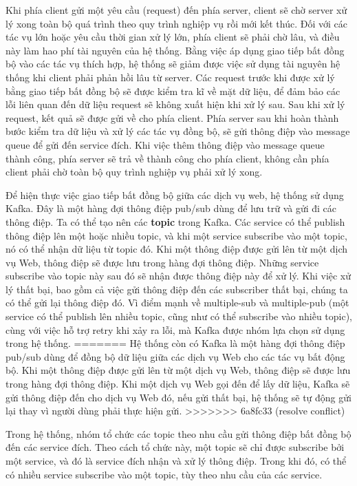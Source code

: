 \par Khi phía client gửi một yêu cầu (request) đến phía server, client sẽ chờ server xử lý xong toàn bộ quá trình theo quy trình nghiệp vụ rồi mới kết thúc. 
Đối với các tác vụ lớn hoặc yêu cầu thời gian xử lý lớn, phía client sẽ phải chờ lâu, và điều này làm hao phí tài nguyên của hệ thống. Bằng việc áp dụng giao tiếp bất đồng bộ vào các tác vụ thích hợp, hệ thống sẽ giảm được việc sử dụng tài nguyên hệ thống khi client phải phản hồi lâu từ server. 
Các request trước khi được xử lý bằng giao tiếp bất đồng bộ sẽ được kiểm tra kĩ về mặt dữ liệu, để đảm bảo các lỗi liên quan đến dữ liệu request sẽ không xuất hiện khi xử lý sau. Sau khi xử lý request, kết quả sẽ được gửi về cho phía client. 
Phía server sau khi hoàn thành bước kiểm tra dữ liệu và xử lý các tác vụ đồng bộ, sẽ gửi thông điệp vào message queue để gửi đến service đích. Khi việc thêm thông điệp vào message queue thành công, phía server sẽ trả về thành công cho phía client, không cần phía client phải chờ toàn bộ quy trình nghiệp vụ phải xử lý xong.

\par Để hiện thực việc giao tiếp bất đồng bộ giữa các dịch vụ web, hệ thống sử dụng Kafka. Đây là một hàng đợi thông điệp pub/sub dùng để lưu trữ và gửi đi các thông điệp.
Ta có thể tạo nên các \textbf{topic} trong Kafka. Các service có thể publish thông điệp lên một hoặc nhiều topic, 
và khi một service subscribe vào một topic, nó có thể nhận dữ liệu từ topic đó. 
Khi một thông điệp được gửi lên từ một dịch vụ Web, thông điệp sẽ được lưu trong hàng đợi thông điệp. 
Những service subscribe vào topic này sau đó sẽ nhận được thông điệp này để xử lý. 
Khi việc xử lý thất bại, bao gồm cả việc gửi thông điệp đến các subscriber thất bại, chúng ta có thể gửi lại thông điệp đó. 
Vì điểm mạnh về multiple-sub và multiple-pub (một service có thể publish lên nhiều topic, cũng như có thể subscribe vào nhiều topic), cùng với việc hỗ trợ retry khi xảy ra lỗi, mà Kafka được nhóm lựa chọn sử dụng trong hệ thống.
=======
Hệ thống còn có Kafka là một hàng đợi thông điệp pub/sub dùng để đồng bộ dữ liệu giữa các dịch vụ Web cho các tác vụ bất động bộ. Khi một thông điệp được gửi lên từ một dịch vụ Web, thông điệp sẽ được lưu trong hàng đợi thông điệp. Khi một dịch vụ Web gọi đến để lấy dữ liệu, Kafka sẽ gửi thông điệp đến cho dịch vụ Web đó, nếu gửi thất bại, hệ thống sẽ tự động gửi lại thay vì người dùng phải thực hiện gửi.
>>>>>>> 6a8fc33 (resolve conflict)

\par Trong hệ thống, nhóm tổ chức các topic theo nhu cầu gửi thông điệp bất đồng bộ đến các service đích. Theo cách tổ chức này, một topic sẽ chỉ được subscribe bởi một service, và đó là service đích nhận và xử lý thông điệp. Trong khi đó, có thể có nhiều service subscribe vào một topic, tùy theo nhu cầu của các service.
